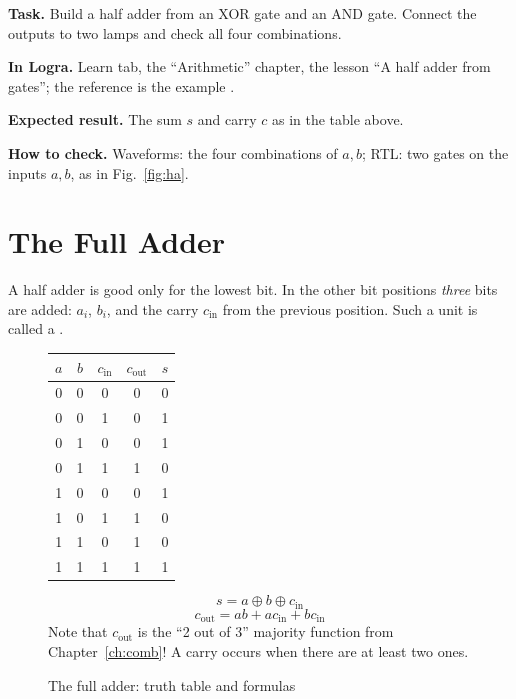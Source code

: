 \begin{diybox}
\textbf{Task.}  Build a half adder from an XOR gate and an AND gate.
 Connect the outputs to two lamps and check all four combinations.

\textbf{In Logra.} Learn tab, the ``Arithmetic'' chapter, the lesson ``A half
adder from gates''; the reference is the example .

\textbf{Expected result.} The sum $s$ and carry $c$ as in the table above.

\textbf{How to check.} Waveforms: the four combinations of $a,b$; RTL: two gates
on the inputs $a,b$, as in Fig.~\ref{fig:ha}.
\end{diybox}

\section{The Full Adder}

A half adder is good only for the lowest bit. In the other bit positions
\emph{three} bits are added: $a_i$, $b_i$, and the carry $c_\text{in}$ from the
previous position. Such a unit is called a .

\begin{figure}[H]
\centering
\begin{minipage}{0.38\textwidth}
\centering
\small
\begin{tabular}{ccc|cc}
\toprule
$a$ & $b$ & $c_\text{in}$ & $c_\text{out}$ & $s$ \\
\midrule
0&0&0 & 0&0 \\
0&0&1 & 0&1 \\
0&1&0 & 0&1 \\
0&1&1 & 1&0 \\
1&0&0 & 0&1 \\
1&0&1 & 1&0 \\
1&1&0 & 1&0 \\
1&1&1 & 1&1 \\
\bottomrule
\end{tabular}
\end{minipage}
\begin{minipage}{0.58\textwidth}
\[
  s = a \oplus b \oplus c_\text{in}
\]
\[
  c_\text{out} = ab + ac_\text{in} + bc_\text{in}
\]
\small Note that $c_\text{out}$ is the ``2 out of 3'' majority function from
Chapter~\ref{ch:comb}! A carry occurs when there are at least two ones.
\end{minipage}
\caption{The full adder: truth table and formulas}
\end{figure}

